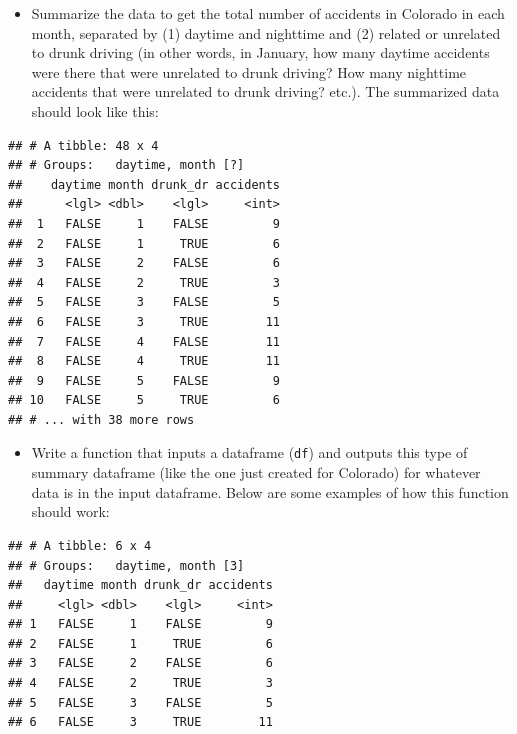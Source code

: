 \documentclass[]{book}
\makeatletter
\newenvironment{Shaded}{\begin{snugshade}}{\end{snugshade}}
\newcommand{\KeywordTok}[1]{\textcolor[rgb]{0.13,0.29,0.53}{\textbf{#1}}}
\newcommand{\DataTypeTok}[1]{\textcolor[rgb]{0.13,0.29,0.53}{#1}}
\newcommand{\StringTok}[1]{\textcolor[rgb]{0.31,0.60,0.02}{#1}}
\newcommand{\OperatorTok}[1]{\textcolor[rgb]{0.81,0.36,0.00}{\textbf{#1}}}
\newcommand{\NormalTok}[1]{#1}
\providecommand{\tightlist}{%
  \setlength{\itemsep}{0pt}\setlength{\parskip}{0pt}}
\newenvironment{kframe}{%
\medskip{}
\setlength{\fboxsep}{.8em}
 \def\at@end@of@kframe{}%
 \ifinner\ifhmode%
  \def\at@end@of@kframe{\end{minipage}}%
  \begin{minipage}{\columnwidth}%
 \fi\fi%
 \def\FrameCommand##1{\hskip\@totalleftmargin \hskip-\fboxsep
 \colorbox{shadecolor}{##1}\hskip-\fboxsep
     \hskip-\linewidth \hskip-\@totalleftmargin \hskip\columnwidth}%
 \MakeFramed {\advance\hsize-\width
   \@totalleftmargin\z@ \linewidth\hsize
   \@setminipage}}%
 {\par\unskip\endMakeFramed%
 \at@end@of@kframe}
\renewenvironment{Shaded}{\begin{kframe}}{\end{kframe}}
\theoremstyle{definition}
\theoremstyle{definition}
\theoremstyle{definition}
\theoremstyle{remark}
\makeatother
\begin{document}
\begin{itemize}
\tightlist
\item
  Summarize the data to get the total number of accidents in Colorado in
  each month, separated by (1) daytime and nighttime and (2) related or
  unrelated to drunk driving (in other words, in January, how many
  daytime accidents were there that were unrelated to drunk driving? How
  many nighttime accidents that were unrelated to drunk driving? etc.).
  The summarized data should look like this:
\end{itemize}

\begin{verbatim}
## # A tibble: 48 x 4
## # Groups:   daytime, month [?]
##    daytime month drunk_dr accidents
##      <lgl> <dbl>    <lgl>     <int>
##  1   FALSE     1    FALSE         9
##  2   FALSE     1     TRUE         6
##  3   FALSE     2    FALSE         6
##  4   FALSE     2     TRUE         3
##  5   FALSE     3    FALSE         5
##  6   FALSE     3     TRUE        11
##  7   FALSE     4    FALSE        11
##  8   FALSE     4     TRUE        11
##  9   FALSE     5    FALSE         9
## 10   FALSE     5     TRUE         6
## # ... with 38 more rows
\end{verbatim}

\begin{itemize}
\tightlist
\item
  Write a function that inputs a dataframe (\texttt{df}) and outputs
  this type of summary dataframe (like the one just created for
  Colorado) for whatever data is in the input dataframe. Below are some
  examples of how this function should work:
\end{itemize}

\begin{Shaded}
\end{Shaded}

\begin{verbatim}
## # A tibble: 6 x 4
## # Groups:   daytime, month [3]
##   daytime month drunk_dr accidents
##     <lgl> <dbl>    <lgl>     <int>
## 1   FALSE     1    FALSE         9
## 2   FALSE     1     TRUE         6
## 3   FALSE     2    FALSE         6
## 4   FALSE     2     TRUE         3
## 5   FALSE     3    FALSE         5
## 6   FALSE     3     TRUE        11
\end{verbatim}
\end{document}
